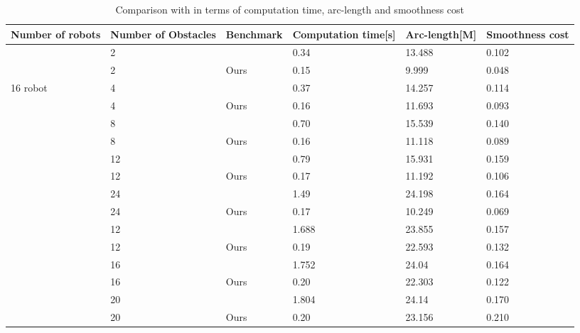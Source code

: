 
\begin{table}
\centering
\caption{ Comparison with \citep{aks_ral21} in terms of computation time, arc-length and smoothness cost }
\label{table_3}
\scriptsize
\begin{tabular}{|p{2cm}|p{2.5cm}|p{3.5cm}|p{2cm}|p{2cm}|p{2cm}|}
\hline
Number of robots & Number of Obstacles &Benchmark & Computation time[s] & Arc-length[M] & Smoothness cost  \\ 
\hline
 \multirow{2}{*}{}&2  & \citep{aks_ral21}  &  0.34 & 13.488 & 0.102\\  
 \cline{2-6} 
 \multirow{2}{*}{}&2  & Ours &  0.15  &  9.999 & 0.048\\  
 \cline{2-6}
 \multirow{2}{*}{16 robot}& 4 & \citep{aks_ral21} & 0.37 & 14.257& 0.114\\
 \cline{2-6}
  \multirow{2}{*}{}& 4 & Ours  & 0.16 & 11.693& 0.093\\
 \cline{2-6}
 \multirow{2}{*}{}&8 & \citep{aks_ral21} & 0.70 &15.539 & 0.140\\
 \cline{2-6}
  \multirow{2}{*}{}&8 & Ours & 0.16 &11.118 & 0.089\\
 \cline{2-6}
 \multirow{2}{*}{}&12 & \citep{aks_ral21}  & 0.79 & 15.931 & 0.159\\
  \cline{2-6}
\multirow{2}{*}{} & 12  & Ours & 0.17 & 11.192 & 0.106\\ 
\cline{2-6}
 \multirow{2}{*}{}&24 & \citep{aks_ral21}  &1.49  & 24.198 & 0.164\\
  \cline{2-6}
\multirow{2}{*}{} & 24  & Ours & 0.17 & 10.249 & 0.069\\ 
\hline \hline
\multirow{2}{*}{} & 12  & \citep{aks_ral21} & 1.688 & 23.855  &0.157\\
\cline{2-6}
\multirow{2}{*}{} & 12  & Ours & 0.19 & 22.593 & 0.132\\
\cline{2-6}
\multirow{2}{*}{} & 16  & \citep{aks_ral21} & 1.752 &24.04 &0.164\\
\cline{2-6}
\multirow{2}{*}{32 robots} & 16  & Ours & 0.20 & 22.303 &0.122 \\
\cline{2-6}
\multirow{2}{*}{} & 20 & \citep{aks_ral21} & 1.804  &24.14 &0.170\\
\cline{2-6}
\multirow{2}{*}{} & 20  & Ours & 0.20 & 23.156 &0.210 \\
\cline{2-6}
\hline
\end{tabular}
\normalsize
\end{table}

